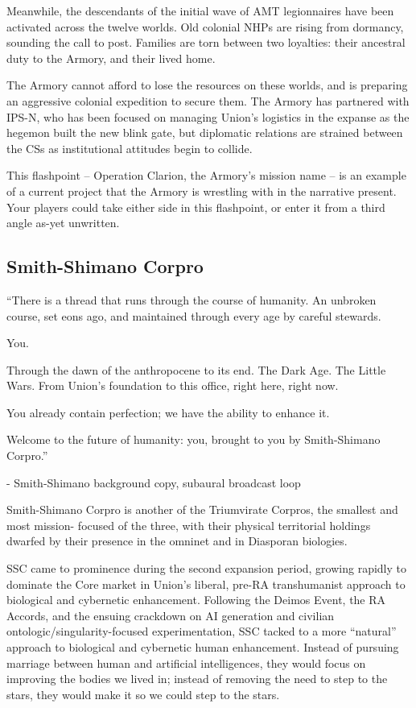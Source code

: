 Meanwhile, the descendants of the initial wave of AMT legionnaires have been activated across
the twelve worlds. Old colonial NHPs are rising from dormancy, sounding the call to post.
Families are torn between two loyalties: their ancestral duty to the Armory, and their lived home.

The Armory cannot afford to lose the resources on these worlds, and is preparing an aggressive
colonial expedition to secure them. The Armory has partnered with IPS-N, who has been focused
on managing Union's logistics in the expanse as the hegemon built the new blink gate, but
diplomatic relations are strained between the CSs as institutional attitudes begin to collide.

This flashpoint -- Operation Clarion, the Armory's mission name -- is an example of a current
project that the Armory is wrestling with in the narrative present. Your players could take either
side in this flashpoint, or enter it from a third angle as-yet unwritten.

\subsection{Smith-Shimano Corpro}
\begin{loreQuote}
         ``There is a thread that runs through the course of humanity. An unbroken course,
         set eons ago, and maintained through every age by careful stewards.

         You.

         Through the dawn of the anthropocene to its end. The Dark Age. The Little Wars.
         From Union's foundation to this office, right here, right now.

         You already contain perfection; we have the ability to enhance it.

         Welcome to the future of humanity: you, brought to you by Smith-Shimano Corpro.''

         \qquad - \quad \textnormal{Smith-Shimano background copy, subaural broadcast loop}
\end{loreQuote}

Smith-Shimano Corpro is another of the Triumvirate Corpros, the smallest and most mission-
focused of the three, with their physical territorial holdings dwarfed by their presence in the
omninet and in Diasporan biologies.

SSC came to prominence during the second expansion period, growing rapidly to dominate the
Core market in Union's liberal, pre-RA transhumanist approach to biological and cybernetic
enhancement. Following the Deimos Event, the RA Accords, and the ensuing crackdown on AI
generation and civilian ontologic/singularity-focused experimentation, SSC tacked to a more
``natural'' approach to biological and cybernetic human enhancement. Instead of pursuing
marriage between human and artificial intelligences, they would focus on improving the bodies
we lived in; instead of removing the need to step to the stars, they would make it so we could
step to the stars.

